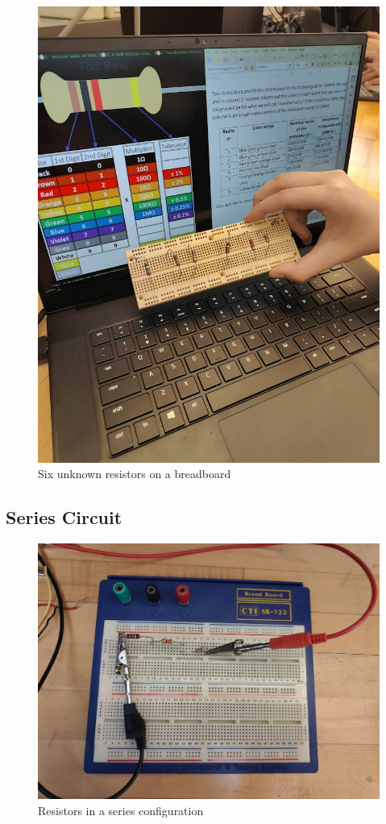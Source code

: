 \documentclass[titlepage]{article}
\begin{document}
            \begin{figure} 
                \centering
                \caption{Six unknown resistors on a breadboard}
                \includegraphics[scale=0.2]{procedure/unknownresistors}
            \end{figure} 


        \subsection{Series Circuit}

        \begin{figure} 
            \centering
            \caption{Resistors in a series configuration}
    \includegraphics[scale=0.2]{procedure/series} 
        \end{figure}
\end{document}
